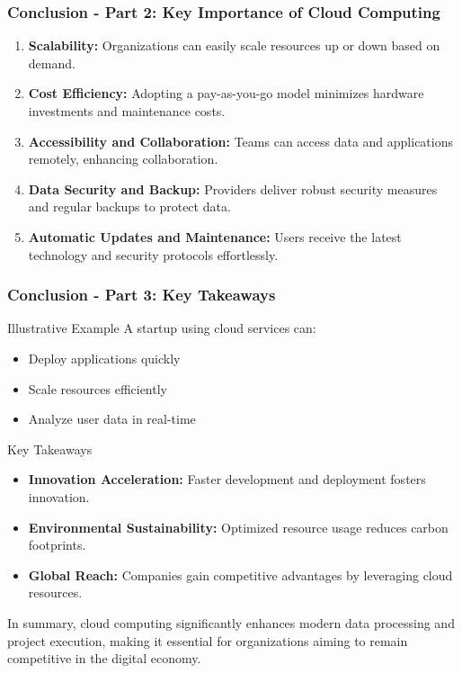 \documentclass[aspectratio=169]{beamer}
\begin{document}
\begin{frame}[fragile]
    \frametitle{Conclusion - Part 2: Key Importance of Cloud Computing}
    \begin{enumerate}
        \item \textbf{Scalability:} Organizations can easily scale resources up or down based on demand.
        \item \textbf{Cost Efficiency:} Adopting a pay-as-you-go model minimizes hardware investments and maintenance costs.
        \item \textbf{Accessibility and Collaboration:} Teams can access data and applications remotely, enhancing collaboration.
        \item \textbf{Data Security and Backup:} Providers deliver robust security measures and regular backups to protect data.
        \item \textbf{Automatic Updates and Maintenance:} Users receive the latest technology and security protocols effortlessly.
    \end{enumerate}
\end{frame}

\begin{frame}[fragile]
    \frametitle{Conclusion - Part 3: Key Takeaways}
    \begin{block}{Illustrative Example}
        A startup using cloud services can:
        \begin{itemize}
            \item Deploy applications quickly
            \item Scale resources efficiently
            \item Analyze user data in real-time
        \end{itemize}
    \end{block}
    
    \begin{block}{Key Takeaways}
        \begin{itemize}
            \item \textbf{Innovation Acceleration:} Faster development and deployment fosters innovation.
            \item \textbf{Environmental Sustainability:} Optimized resource usage reduces carbon footprints.
            \item \textbf{Global Reach:} Companies gain competitive advantages by leveraging cloud resources.
        \end{itemize}
    \end{block}
    
    In summary, cloud computing significantly enhances modern data processing and project execution, making it essential for organizations aiming to remain competitive in the digital economy.
\end{frame}
\end{document}
